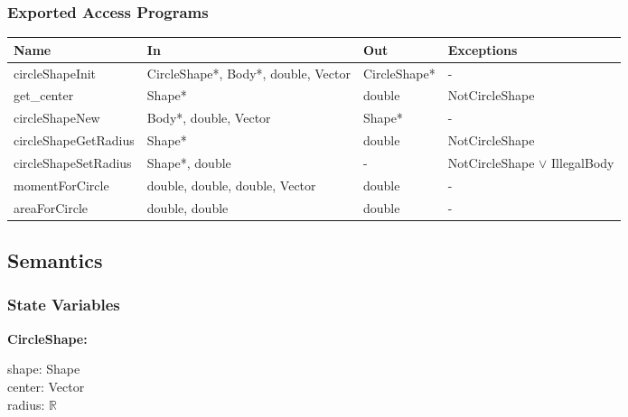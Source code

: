 \documentclass[12pt]{article}
\newcommand{\vor}{$\vee$ }
\newcommand{\R}{$\mathbb{R}$}
\begin{document}
\subsubsection{Exported Access Programs} \label{SecEAPCircle}
	\renewcommand*{\arraystretch}{1.2}
	\begin{longtable}{| y | x{3.5cm} | y | x{3.5cm} |} 
		\hline \textbf{Name} & \textbf{In} & \textbf{Out} & \textbf{Exceptions} \\ \hline 
		circleShapeInit & CircleShape*, Body*, double, Vector & CircleShape* & - \\ \hline
		get_center & Shape* & double & NotCircleShape \\ \hline
		circleShapeNew & Body*, double, Vector & Shape* & - \\ \hline
		circleShapeGetRadius & Shape* & double & NotCircleShape \\ \hline
		circleShapeSetRadius & Shape*, double & - & NotCircleShape \vor IllegalBody \\ \hline
		momentForCircle & double, double, double, Vector & double & - \\ \hline
		areaForCircle & double, double & double & - \\ \hline
	\end{longtable}
	
\subsection{Semantics}

\subsubsection{State Variables} \label{SecSVCircle}
	\textbf{CircleShape:}
	\begin{multicols}{2}
		\noindent shape: Shape \\
		center: Vector \\
		radius: \R
	\end{multicols}
	
\end{document}
